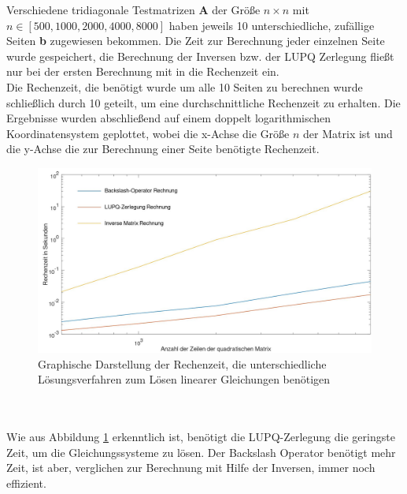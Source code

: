 Verschiedene tridiagonale Testmatrizen \textbf{A} der Größe $n \times n$ mit $n \in [500, 1000, 2000, 4000, 8000]$ haben jeweils 10 unterschiedliche, zufällige Seiten \textbf{b} zugewiesen bekommen. Die Zeit zur Berechnung jeder einzelnen Seite wurde gespeichert, die Berechnung der Inversen bzw. der LUPQ Zerlegung fließt nur bei der ersten Berechnung mit in die Rechenzeit ein. \\
Die Rechenzeit, die benötigt wurde um alle 10 Seiten zu berechnen wurde schließlich durch 10 geteilt, um eine durchschnittliche Rechenzeit zu erhalten. Die Ergebnisse wurden abschließend auf einem doppelt logarithmischen Koordinatensystem geplottet, wobei die x-Achse die Größe $n$ der Matrix ist und die y-Achse die zur Berechnung einer Seite benötigte Rechenzeit.
\begin{figure}
	\includegraphics[width=\textwidth]{data/LaufzeitPlot}
	\caption{Graphische Darstellung der Rechenzeit, die unterschiedliche Lösungsverfahren zum Lösen linearer Gleichungen benötigen}
	\label{fig:Laufzeit}
\end{figure}
\\ \\
Wie aus Abbildung \ref{fig:Laufzeit} erkenntlich ist, benötigt die LUPQ-Zerlegung die geringste Zeit, um die Gleichungssysteme zu lösen. Der Backslash Operator benötigt mehr Zeit, ist aber, verglichen zur Berechnung mit Hilfe der Inversen, immer noch effizient. 